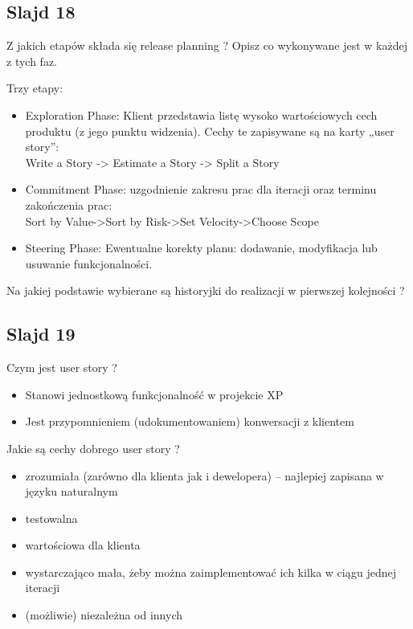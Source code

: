 \documentclass[a4paper,15pt]{article}
\newcommand{\question}[2]{
    \begin{tcolorbox}[colback=mRed!5!white,colframe=mRed,title={Kolokwium 2018 #1}]
        #2
    \end{tcolorbox}
}
\begin{document}
\subsection{Slajd 18}
\begin{framed}
Z jakich etapów składa się release planning ? Opisz co wykonywane jest w każdej z tych faz.
\end{framed}

Trzy etapy:
\begin{itemize}
\item Exploration Phase: Klient przedstawia listę wysoko wartościowych cech produktu (z jego punktu widzenia). Cechy te zapisywane są na karty „user story”: \\ Write a Story -> Estimate a Story -> Split a Story
\item Commitment Phase: uzgodnienie zakresu prac dla iteracji oraz terminu zakończenia prac: \\ Sort by Value->Sort by Risk->Set Velocity->Choose Scope
\item Steering Phase: Ewentualne korekty planu: dodawanie, modyfikacja lub usuwanie funkcjonalności.
\end{itemize}
\question{}{
Na jakiej podstawie wybierane są historyjki do realizacji w pierwszej kolejności ?
}

\subsection{Slajd 19}
\begin{framed}
Czym jest user story ?
\end{framed}
\begin{itemize}
\item Stanowi jednostkową funkcjonalność w projekcie XP
\item Jest przypomnieniem (udokumentowaniem) konwersacji z klientem
\end{itemize}

\begin{framed}
Jakie są cechy dobrego user story ?
\end{framed}
\begin{itemize}
\item zrozumiała (zarówno dla klienta jak i dewelopera) – najlepiej zapisana w języku naturalnym
\item testowalna
\item wartościowa dla klienta
\item wystarczająco mała, żeby można zaimplementować ich kilka w ciągu jednej iteracji
\item (możliwie) niezależna od innych
\end{itemize}
\end{document}
